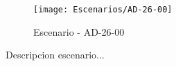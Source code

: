 \begin{figure}[H]
\centering
\texttt{[image: Escenarios/AD-26-00]}
\caption{Escenario - AD-26-00}
\label{fig:AD-26-00}
\end{figure}

Descripcion escenario...
\clearpage
